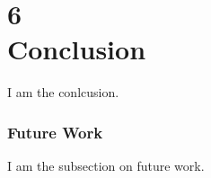 \chapter[Conclusion]{6\\Conclusion}
\label{chap:conc}
I am the conlcusion.

\subsection*{Future Work}
I am the subsection on future work.


